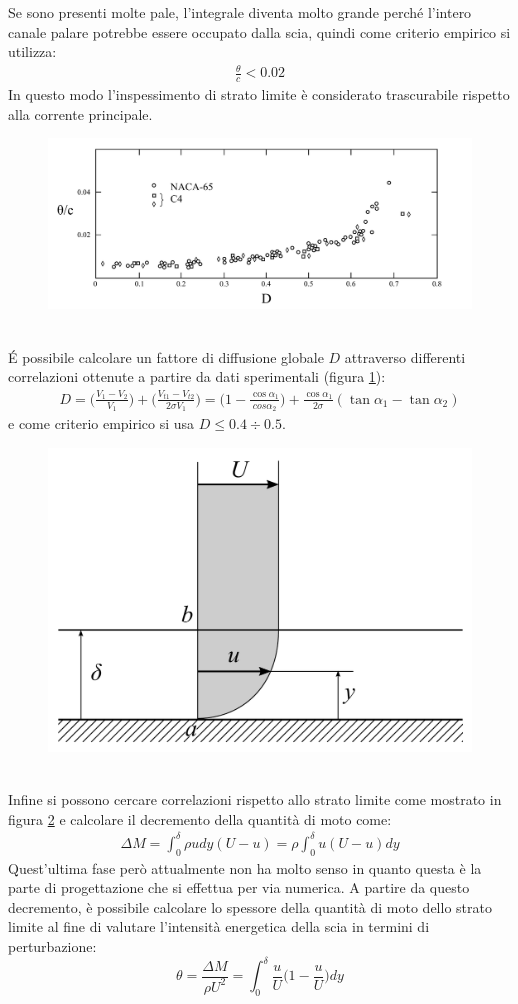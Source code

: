 Se sono presenti molte pale, l'integrale diventa molto grande perché l'intero canale palare potrebbe essere occupato dalla scia, quindi come criterio empirico si utilizza:
\begin{align*}
\frac{\theta}{c} < 0.02
\end{align*}
In questo modo l'inspessimento di strato limite è considerato trascurabile rispetto alla corrente principale. 
\begin{figure}
\centering
  \includegraphics[width=\textwidth]{fig/CritCarico3.pdf}
\caption{}
\label{fig:CritCarico3}
\end{figure}
\\\'E possibile calcolare un fattore di diffusione globale $D$ attraverso differenti correlazioni ottenute a partire da dati sperimentali (figura \ref{fig:CritCarico3}):
\begin{align*}
D = \bigg( \frac{V_1 - V_2}{V_1} \bigg) + \bigg( \frac{V_{t1} - V_{t2}}{2 \sigma V_1} \bigg) = \bigg( 1 - \frac{\cos \alpha_1}{cos \alpha_2} \bigg) + \frac{\cos \alpha_1}{2 \sigma} (\tan \alpha_1 - \tan \alpha_2)
\end{align*}
e come criterio empirico si usa $ D \leqslant 0.4 \div 0.5  $.
\begin{figure}
\centering
  \includegraphics[width=.4\textwidth]{fig/CritCarico4.pdf}
\caption{}
\label{fig:CritCarico4}
\end{figure}
\\Infine si possono cercare correlazioni rispetto allo strato limite come mostrato in figura \ref{fig:CritCarico4} e calcolare il decremento della quantità di moto come:
\begin{align*}
\Delta M = \int_0^{\delta} \rho u dy (U-u) = \rho \int_0^{\delta} u (U-u) dy
\end{align*} 
Quest'ultima fase però attualmente non ha molto senso in quanto questa è la parte di progettazione che si effettua per via numerica. A partire da questo decremento, è possibile calcolare lo spessore della quantità di moto dello strato limite al fine di valutare l'intensità energetica della scia in termini di perturbazione:
\begin{equation}
\theta = \frac{\Delta M}{\rho U^2} = \int_0^{\delta} \frac{u}{U} \bigg( 1 -\frac{u}{U} \bigg) dy
\end{equation}

